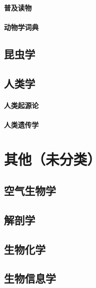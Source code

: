 \documentclass[UTF8]{../NatureUniverse}
\begin{document}
    \subsubsection{普及读物}
    \subsubsection{动物学词典}
\section{昆虫学}
\section{人类学}
    \subsubsection{人类起源论}
    \subsubsection{人类遗传学}




\chapter{其他（未分类）}





\section{空气生物学}
\section{解剖学}
\section{生物化学}
\section{生物信息学}
\end{document}
